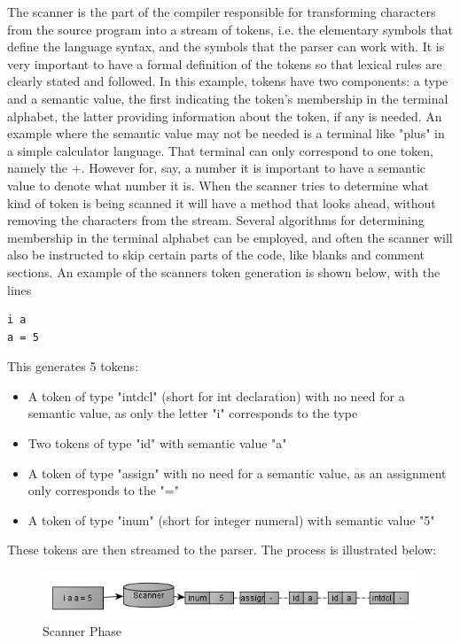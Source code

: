 The scanner is the part of the compiler responsible for transforming characters from the source program into a stream of tokens, i.e. the elementary symbols that define the language syntax, and the symbols that the parser can work with.
It is very important to have a formal definition of the tokens so that lexical rules are clearly stated and followed.
In this example, tokens have two components: a type and a semantic value, the first indicating the token's membership in the terminal alphabet, the latter providing information about the token, if any is needed.
An example where the semantic value may not be needed is a terminal like "plus" in a simple calculator language. That terminal can only correspond to one token, namely the +. However for, say, a number it is important to have a semantic value to denote what number it is.
When the scanner tries to determine what kind of token is being scanned it will have a method that looks ahead, without removing the characters from the stream. Several algorithms for determining membership in the terminal alphabet can be employed, and often the scanner will also be instructed to skip certain parts of the code, like blanks and comment sections.
An example of the scanners token generation is shown below, with the lines
\begin{lstlisting}
i a 
a = 5
\end{lstlisting}

This generates 5 tokens: 
\begin{itemize}
\item A token of type "intdcl" (short for int declaration) with no need for a semantic value, as only the letter "i" corresponds to the type 
\item Two tokens of type "id" with semantic value "a" 
\item A token of type "assign" with no need for a semantic value, as an assignment only corresponds to the "="
\item A token of type "inum" (short for integer numeral) with semantic value "5"
\end{itemize}

These tokens are then streamed to the parser. The process is illustrated below:
\begin{figure}[ht]
	\centering
		\includegraphics[scale = 0.6]{img/scanner.png}
	\caption{Scanner Phase}
	\label{fig:scanner}
\end{figure}


